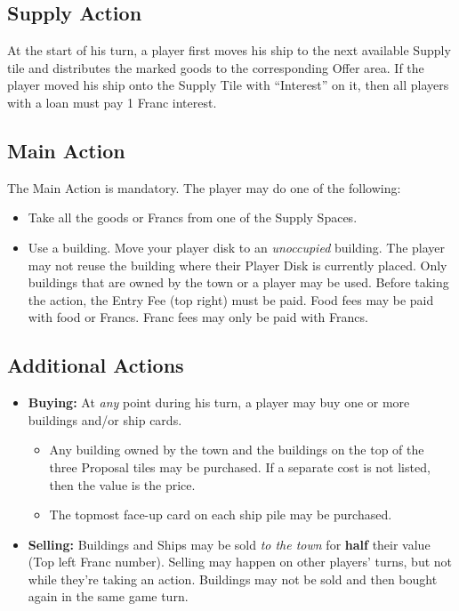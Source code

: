 \documentclass[12pt]{article}
\newenvironment{itemizeCustom}
{\begin{itemize}
  \setlength{\itemsep}{1pt}
  \setlength{\parskip}{0pt}
  \setlength{\parsep}{0pt}}
{\end{itemize}}
\begin{document}
\begin{multicols*}{2}
\subsection*{Supply Action}
At the start of his turn, a player first moves his ship to the next available Supply tile and distributes the marked goods to the corresponding Offer area. If the player moved his ship onto the Supply Tile with ``Interest'' on it, then all players with a loan must pay 1 Franc interest.

\subsection*{Main Action}
The Main Action is mandatory. The player may do one of the following:
\begin{itemizeCustom}
	\item Take all the goods or Francs from one of the Supply Spaces.
	\item Use a building. Move your player disk to an \emph{unoccupied} building. The player may not reuse the building where their Player Disk is currently placed. Only buildings that are owned by the town or a player may be used. Before taking the action, the Entry Fee (top right) must be paid. Food fees may be paid with food or Francs. Franc fees may only be paid with Francs.
\end{itemizeCustom}

\subsection*{Additional Actions}
\begin{itemizeCustom}
	\item \textbf{Buying:} At \emph{any} point during his turn, a player may buy one or more buildings and/or ship cards.
		\begin{itemizeCustom}
			\item Any building owned by the town and the buildings on the top of the three Proposal tiles may be purchased. If a separate cost is not listed, then the value is the price.
			\item The topmost face-up card on each ship pile may be purchased.
		\end{itemizeCustom}
	\item \textbf{Selling:} Buildings and Ships may be sold \emph{to the town} for \textbf{half} their value (Top left Franc number). Selling may happen on other players' turns, but not while they're taking an action. Buildings may not be sold and then bought again in the same game turn.
\end{itemizeCustom}


\end{multicols*}
\end{document}
